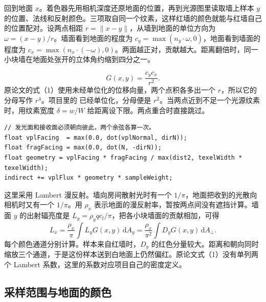 回到地面 $x$。着色器先用相机深度还原地面的位置，再到光源图里读取墙上样本 $y$ 的位置、法线和反射颜色。三项取自同一个纹素，这样红墙的颜色就能与红墙自己的位置配对。设两点相距 $r=\lVert x-y\rVert$，从墙到地面的单位方向为 $\omega=(x-y)/r$。墙面看到地面的程度为 $c_y=\max(n_y\cdot\omega,0)$，地面看到墙面的程度为 $c_x=\max(n_x\cdot(-\omega),0)$。两面越正对，贡献越大。距离翻倍时，同一小块墙在地面处张开的立体角约缩到四分之一。

\[
 G(x,y)=\frac{c_y c_x}{r^2}.
\]
原论文的式（1）使用未经单位化的位移向量，两个点积各多出一个 $r$，所以它的分母写作 $r^4$。项目里的  已经单位化，分母便是 $r^2$。当两点近到不足一个光源纹素时，用纹素宽度 $\delta=w/W$ 给距离设下限。两点重合时直接跳过。
\begin{lstlisting}
// 发光面和接收面必须朝向彼此，两个余弦各算一次。
float vplFacing  = max(0.0, dot(vplNormal, dirN));
float fragFacing = max(0.0, dot(N, -dirN));
float geometry = vplFacing * fragFacing / max(dist2, texelWidth * texelWidth);
indirect += vplFlux * geometry * sampleWeight;
\end{lstlisting}

这里采用 Lambert 漫反射。墙向房间散射光时有一个 $1/\pi$，地面把收到的光散向相机时又有一个 $1/\pi$。用 $\rho_x$ 表示地面的漫反射率，暂按两点间没有遮挡计算。墙面 $y$ 的出射辐亮度是 $L_y=\rho_y q c_l/\pi$，把各小块墙面的贡献相加，可得
\[
 L_x=\frac{\rho_x}{\pi}\int L_y G(x,y)\,\mathrm dA_y
    =\frac{\rho_x}{\pi^2}\int D_y G(x,y)\,\mathrm dA_\perp.
\]
每个颜色通道分别计算。样本来自红墙时，$D_y$ 的红色分量较大。距离和朝向同时缩放三个通道，于是这份样本送到白地面上仍然偏红。原论文式（1）没有单列两个 Lambert 系数，这里的系数对应项目自己的密度定义。

\newpage
\subsection{采样范围与地面的颜色}

